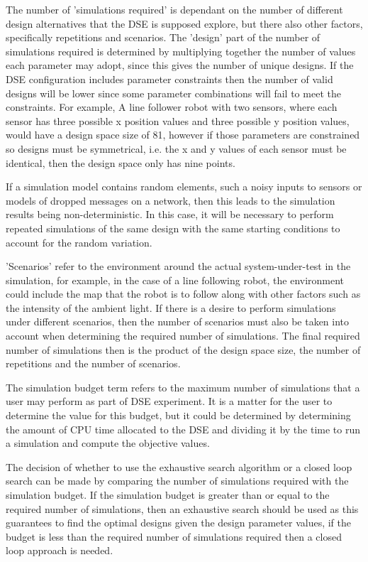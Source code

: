 The number of 'simulations required' is dependant on the number of different design alternatives that the DSE is supposed explore, but there also other factors, specifically repetitions and scenarios.  The 'design' part of the number of simulations required is determined by multiplying together the number of values each parameter may adopt, since this gives the number of unique designs.  If the DSE configuration includes parameter constraints then the number of valid designs will be lower since some parameter combinations will fail to meet the constraints.  For example, A line follower robot with two sensors, where each sensor has three possible x position values and three possible y position values, would have a design space size of 81, however if those parameters are constrained so designs must be symmetrical, i.e. the x and y values of each sensor must be identical, then the design space only has nine points.

If a simulation model contains random elements, such a noisy inputs to sensors or models of dropped messages on a network, then this leads to the simulation results being non-deterministic.  In this case, it will be necessary to perform repeated simulations of the same design with the same starting conditions to account for the random variation.

'Scenarios' refer to the environment around the actual system-under-test in the simulation, for example, in the case of a line following robot, the environment could include the map that the robot is to follow along with other factors such as the intensity of the ambient light.  If there is a desire to perform simulations under different scenarios, then the number of scenarios must also be taken into account when determining the required number of simulations.  The final required number of simulations then is the product of the design space size, the number of repetitions and the number of scenarios.

The simulation budget term refers to the maximum number of simulations that a user may perform as part of DSE experiment.  It is a matter for the user to determine the value for this budget, but it could be determined by determining the amount of CPU time allocated to the DSE and dividing it by the time to run a simulation and compute the objective values.


The decision of whether to use the exhaustive search algorithm or a closed loop search can be made by comparing the number of simulations required with the simulation budget.  If the simulation budget is greater than or equal to the required number of simulations, then an exhaustive search should be used as this guarantees to find the optimal designs given the design parameter values, if the budget is less than the required number of simulations required then a closed loop approach is needed.

